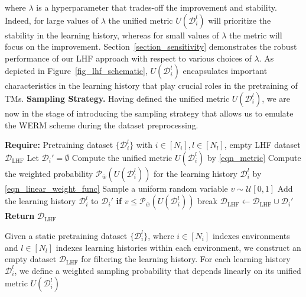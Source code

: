 \documentclass{article}
\def\ccalD{{\ensuremath{\mathcal D}}}
\def\ccalU{{\ensuremath{\mathcal U}}}
\begin{document}
where $\lambda$ is a hyperparameter that trades-off the improvement and stability. Indeed, for large values of $\lambda$ the unified metric $U(\ccalD_i^l)$ will prioritize the stability in the learning history, whereas for small values of $\lambda$ the metric will focus on the improvement. Section~\ref{section_sensitivity} demonstrates the robust performance of our LHF approach with respect to various choices of $\lambda$. As depicted in Figure~\ref{fig_lhf_schematic}, $U(\ccalD_i^l)$ encapsulates important characteristics in the learning history that play crucial roles in the pretraining of TMs.
\textbf{Sampling Strategy.}
Having defined the unified metric $U(\ccalD_i^l)$, we are now in the stage of introducing the sampling strategy that allows us to emulate the WERM scheme during the dataset preprocessing.
\begin{algorithm}
\caption{Learning History Filtering (LHF)}
\label{alg_lhf}
\begin{algorithmic}[1]
        \STATE \textbf{Require:} Pretraining dataset $\{\ccalD_i^l\}$ with $i \in [N_i], l \in [N_l]$, empty LHF dataset $\ccalD_\text{LHF}$
            \STATE Let $\ccalD_i' = \emptyset$
            \WHILE{$|\ccalD_i'| < |\ccalD_i|$}
                    \STATE Compute the unified metric $U(\ccalD_i^l)$ by \eqref{eqn_metric}
                    \STATE Compute the weighted probability $\mathcal{P}_{\bar{w}}(U(\ccalD_i^l))$ for the learning history $\ccalD_i^l$ by \eqref{eqn_linear_weight_func}
                    \STATE Sample a uniform random variable $v \sim \ccalU[0, 1]$
                    \STATE Add the learning history $\ccalD_i^l$ to $\ccalD_i'$ \textbf{if} $v \leq \mathcal{P}_{\bar{w}}(U(\ccalD_i^l))$
                    \IF{$|\ccalD_i'| = |\ccalD_i|$}
                    \STATE break
                    \ENDIF
                \ENDFOR
            \ENDWHILE
            \STATE $\ccalD_\text{LHF} \leftarrow \ccalD_\text{LHF} \cup \ccalD_i'$
        \ENDFOR
        \STATE \textbf{Return} $\ccalD_\text{LHF}$
\end{algorithmic}
\end{algorithm}
Given a static pretraining dataset $\{\ccalD_i^l\}$, where $i \in [N_i]$ indexes environments and $l \in [N_l]$ indexes learning histories within each environment, we construct an empty dataset $\ccalD_{\text{LHF}}$ for filtering the learning history. For each learning history $\ccalD_i^l$, we define a weighted sampling probability that depends linearly on its unified metric $U(\ccalD_i^l)$
\end{document}
